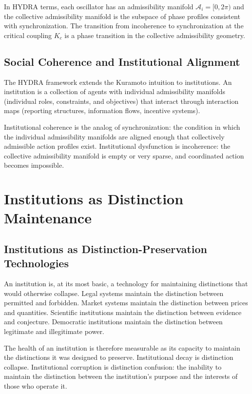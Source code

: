 \documentclass[12pt,a4paper]{book}
\theoremstyle{remark}
\theoremstyle{definition}
\begin{document}
In HYDRA terms, each oscillator has an admissibility manifold
$\mathcal{A}_i = [0,2\pi)$ and the collective admissibility manifold
is the subspace of phase profiles consistent with synchronization. The
transition from incoherence to synchronization at the critical coupling
$K_c$ is a phase transition in the collective admissibility geometry.

\section{Social Coherence and Institutional Alignment}

The HYDRA framework extends the Kuramoto intuition to institutions.
An institution is a collection of agents with individual admissibility
manifolds (individual roles, constraints, and objectives) that interact
through interaction maps (reporting structures, information flows,
incentive systems).

Institutional coherence is the analog of synchronization: the condition
in which the individual admissibility manifolds are aligned enough that
collectively admissible action profiles exist. Institutional dysfunction
is incoherence: the collective admissibility manifold is empty or very
sparse, and coordinated action becomes impossible.

\chapter{Institutions as Distinction Maintenance}

\section{Institutions as Distinction-Preservation Technologies}

An institution is, at its most basic, a technology for maintaining
distinctions that would otherwise collapse. Legal systems maintain the
distinction between permitted and forbidden. Market systems maintain the
distinction between prices and quantities. Scientific institutions
maintain the distinction between evidence and conjecture. Democratic
institutions maintain the distinction between legitimate and illegitimate
power.

The health of an institution is therefore measurable as its capacity
to maintain the distinctions it was designed to preserve. Institutional
decay is distinction collapse. Institutional corruption is distinction
confusion: the inability to maintain the distinction between the
institution's purpose and the interests of those who operate it.
\end{document}
